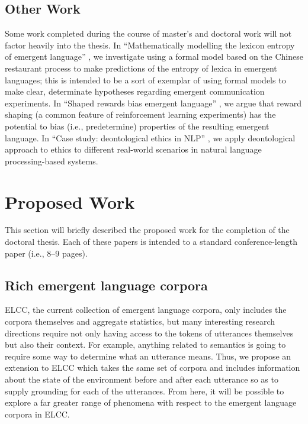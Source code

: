 \subsection{Other Work}
Some work completed during the course of master's and doctoral work will not factor heavily into the thesis.
In ``Mathematically modelling the lexicon entropy of emergent language'' \citep{boldt2022mathematically}, we investigate using a formal model based on the Chinese restaurant process to make predictions of the entropy of lexica in emergent languages; this is intended to be a sort of exemplar of using formal models to make clear, determinate hypotheses regarding emergent communication experiments.
In ``Shaped rewards bias emergent language'' \citep{boldt2022shaped}, we argue that reward shaping (a common feature of reinforcement learning experiments) has the potential to bias (i.e., predetermine) properties of the resulting emergent language.
In ``Case study: deontological ethics in NLP'' \citep{prabhumoye-etal-2021-case}, we apply deontological approach to ethics to different real-world scenarios in natural language processing-based systems.



\section{Proposed Work}
This section will briefly described the proposed work for the completion of the doctoral thesis.
Each of these papers is intended to a standard conference-length paper (i.e., 8--9 pages).


\subsection{Rich emergent language corpora}
ELCC, the current collection of emergent language corpora, only includes the corpora themselves and aggregate statistics, but many interesting research directions require not only having access to the tokens of utterances themselves but also their context.
For example, anything related to semantics is going to require some way to determine what an utterance means.
Thus, we propose an extension to ELCC which takes the same set of corpora and includes information about the state of the environment before and after each utterance so as to supply grounding for each of the utterances.
From here, it will be possible to explore a far greater range of phenomena with respect to the emergent language corpora in ELCC\@.

